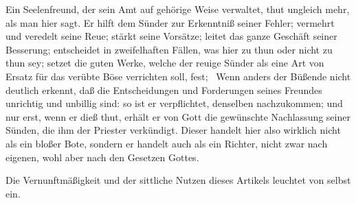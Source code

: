 \begin{aufza}
 Ein Seelenfreund, der sein Amt auf gehörige Weise verwaltet, thut ungleich mehr, als man hier sagt. Er hilft dem Sünder zur Erkenntniß seiner Fehler; vermehrt und veredelt seine Reue; stärkt seine Vorsätze; leitet das ganze Geschäft seiner Besserung; entscheidet in  zweifelhaften Fällen, was hier zu thun oder nicht zu thun sey; setzet die guten Werke, welche der reuige Sünder als eine Art von Ersatz für das verübte Böse verrichten soll, fest; \usw\ Wenn anders der Büßende nicht deutlich erkennt, daß die Entscheidungen und Forderungen seines Freundes unrichtig und unbillig sind: so ist er verpflichtet, denselben nachzukommen; und nur erst, wenn er dieß thut, erhält er von Gott die gewünschte Nachlassung seiner Sünden, die ihm der Priester verkündigt. Dieser handelt hier also wirklich nicht als ein bloßer Bote, sondern er handelt auch als ein Richter, nicht zwar nach eigenen, wohl aber nach den Gesetzen Gottes.
\item Die Vernunftmäßigkeit und der sittliche Nutzen dieses Artikels leuchtet von selbst ein.~
\end{aufza}
